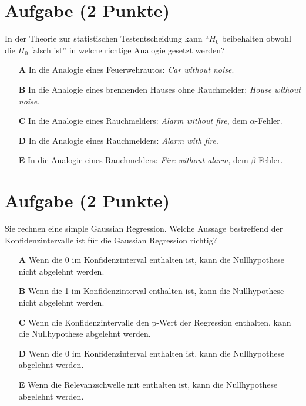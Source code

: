 \documentclass[a4paper, 10pt]{scrartcl}\usepackage[]{graphicx}\usepackage[]{xcolor}
\begin{document}
\section{Aufgabe \hfill (2 Punkte)}



In der Theorie zur statistischen Testentscheidung kann "`$H_0$ beibehalten obwohl die $H_0$ falsch ist"'
in welche richtige Analogie gesetzt werden?



\begin{enumerate}
\item [\textbf{A} \msquare] In die Analogie eines Feuerwehrautos: \textit{Car without noise}.
\item [\textbf{B} \msquare] In die Analogie eines brennenden Hauses ohne Rauchmelder: \textit{House without noise}.
\item [\textbf{C} \msquare] In die Analogie eines Rauchmelders: \textit{Alarm without fire}, dem $\alpha$-Fehler.
\item [\textbf{D} \msquare] In die Analogie eines Rauchmelders: \textit{Alarm with fire}.
\item [\textbf{E} \msquare] In die Analogie eines Rauchmelders: \textit{Fire without alarm}, dem $\beta$-Fehler.
\end{enumerate}

\section{Aufgabe \hfill (2 Punkte)}



Sie rechnen eine simple Gaussian Regression. Welche Aussage bestreffend der
Konfidenzintervalle ist f{\"u}r die Gaussian Regression richtig?



\begin{enumerate}
\item [\textbf{A} \msquare] Wenn die 0 im Konfidenzinterval enthalten ist, kann die Nullhypothese nicht abgelehnt werden.
\item [\textbf{B} \msquare] Wenn die 1 im Konfidenzinterval enthalten ist, kann die Nullhypothese nicht abgelehnt werden.
\item [\textbf{C} \msquare] Wenn die Konfidenzintervalle den p-Wert der Regression enthalten, kann die Nullhypothese abgelehnt werden.
\item [\textbf{D} \msquare] Wenn die 0 im Konfidenzinterval enthalten ist, kann die Nullhypothese abgelehnt werden.
\item [\textbf{E} \msquare] Wenn die Relevanzschwelle mit enthalten ist, kann die Nullhypothese abgelehnt werden.
\end{enumerate}
\end{document}
